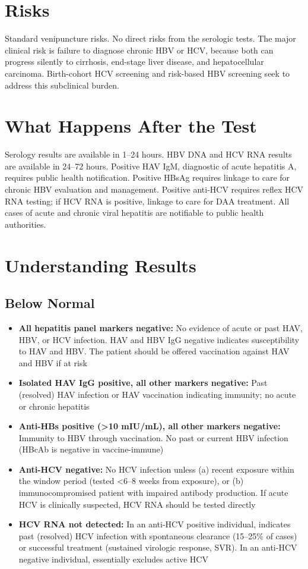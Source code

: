 \section*{Risks}
Standard venipuncture risks. No direct risks from the serologic tests. The major clinical risk is failure to diagnose chronic HBV or HCV, because both can progress silently to cirrhosis, end-stage liver disease, and hepatocellular carcinoma. Birth-cohort HCV screening and risk-based HBV screening seek to address this subclinical burden.

\section*{What Happens After the Test}
Serology results are available in 1--24 hours. HBV DNA and HCV RNA results are available in 24--72 hours. Positive HAV IgM, diagnostic of acute hepatitis A, requires public health notification. Positive HBsAg requires linkage to care for chronic HBV evaluation and management. Positive anti-HCV requires reflex HCV RNA testing; if HCV RNA is positive, linkage to care for DAA treatment. All cases of acute and chronic viral hepatitis are notifiable to public health authorities.

\section*{Understanding Results}

\subsection*{Below Normal}
\begin{itemize}
  \item \textbf{All hepatitis panel markers negative:} No evidence of acute or past HAV, HBV, or HCV infection. HAV and HBV IgG negative indicates susceptibility to HAV and HBV. The patient should be offered vaccination against HAV and HBV if at risk
  \item \textbf{Isolated HAV IgG positive, all other markers negative:} Past (resolved) HAV infection or HAV vaccination indicating immunity; no acute or chronic hepatitis
  \item \textbf{Anti-HBs positive (>10 mIU/mL), all other markers negative:} Immunity to HBV through vaccination. No past or current HBV infection (HBcAb is negative in vaccine-immune)
  \item \textbf{Anti-HCV negative:} No HCV infection unless (a) recent exposure within the window period (tested <6--8 weeks from exposure), or (b) immunocompromised patient with impaired antibody production. If acute HCV is clinically suspected, HCV RNA should be tested directly
  \item \textbf{HCV RNA not detected:} In an anti-HCV positive individual, indicates past (resolved) HCV infection with spontaneous clearance (15--25\% of cases) or successful treatment (sustained virologic response, SVR). In an anti-HCV negative individual, essentially excludes active HCV
\end{itemize}

